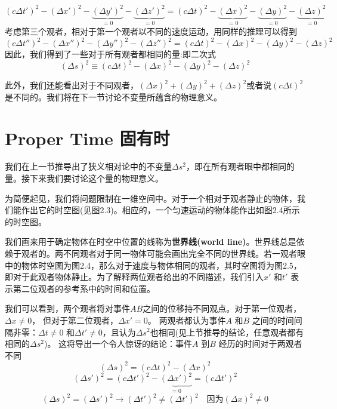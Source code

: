 \begin{equation}\label{eq2.11}
\left( c \Delta t' \right)^2
-\left(\Delta x' \right)^2
-\underbrace{\left(\Delta y' \right)^2}_{=0}
-\underbrace{\left(\Delta z' \right)^2}_{=0}
=
\left( c \Delta t \right)^2
-\underbrace{\left(\Delta x \right)^2}_{=0}
-\underbrace{\left(\Delta y \right)^2}_{=0}
-\underbrace{\left(\Delta z \right)^2}_{=0}
\end{equation}
考虑第三个观者，相对于第一个观者以不同的速度运动，用同样的推理可以得到
\begin{equation}\label{eq2.12}
\left( c \Delta t'' \right)^2
-\left(\Delta x'' \right)^2
-\left(\Delta y'' \right)^2
-\left(\Delta z'' \right)^2
=
\left( c \Delta t \right)^2
-\left(\Delta x \right)^2
-\left(\Delta y \right)^2
-\left(\Delta z \right)^2
\end{equation}
因此，我们得到了一些对于所有观者都相同的量:即二次式
\begin{equation}\label{eq2.13}
(\Delta s)^2
\equiv\left( c \Delta t \right)^2
-\left(\Delta x \right)^2
-\left(\Delta y \right)^2
-\left(\Delta z \right)^2
\end{equation}

此外，我们还能看出对于不同观者，$(\Delta x)^2+(\Delta y)^2+(\Delta z)^2$或者说$(c\Delta t)^2$是不同的。我们将在下一节讨论不变量所蕴含的物理意义。


\section[固有时]{Proper Time 固有时}
\label{sec2.2}
我们在上一节推导出了狭义相对论中的不变量$\Delta s^2$，即在所有观者眼中都相同的量。接下来我们要讨论这个量的物理意义。

为简便起见，我们将问题限制在一维空间中。对于一个相对于观者静止的物体，我们能作出它的时空图(见图2.3)。相应的，一个匀速运动的物体能作出如图2.4所示的时空图。

我们画来用于确定物体在时空中位置的线称为{\bf{世界线(world line)}}。世界线总是依赖于观者的。两不同观者对于同一物体可能会画出完全不同的世界线。若一观者眼中的物体时空图为图2.4，那么对于速度与物体相同的观者，其时空图将为图2.5，即对于此观者物体静止。为了解释两位观者给出的不同描述，我们引入$x'$ 和$t'$ 表示第二位观者的参考系中的时间和位置。

我们可以看到，两个观者将对事件$AB$之间的位移持不同观点。对于第一位观者，$\Delta x \neq 0$， 但对于第二位观者，$\Delta x' = 0$。 两观者都认为事件$A$ 和$B$ 之间的时间间隔非零：$\Delta t \neq 0$ 和$\Delta t' \neq 0$，且认为$\Delta s^2$也相同(见上节推导的结论，任意观者都有相同的$\Delta s^2$)。 这将导出一个令人惊讶的结论：事件$A$ 到$B$ 经历的时间对于两观者不同
\begin{equation}\label{eq2.14}
  (\Delta s)^2
  =(c\Delta t)^2
  -(\Delta x)^2
\end{equation}
\begin{equation}\label{eq2.15}
  (\Delta s')^2
  =(c\Delta t')^2
  -\underbrace{(\Delta x')^2}_{=0}
  =(c\Delta t')^2
\end{equation}
\begin{equation}\label{eq2.16}
   (\Delta s)^2
   = (\Delta s')^2
   \rightarrow
    (\Delta t')^2 \neq
     (\Delta t')^2
     \quad \text{因为}  (\Delta x)^2 \neq 0
\end{equation}

